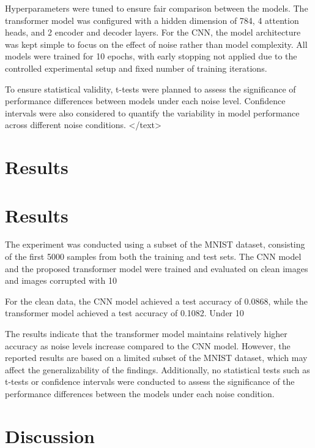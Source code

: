 \documentclass{article}
\begin{document}
Hyperparameters were tuned to ensure fair comparison between the models. The transformer model was configured with a hidden dimension of 784, 4 attention heads, and 2 encoder and decoder layers. For the CNN, the model architecture was kept simple to focus on the effect of noise rather than model complexity. All models were trained for 10 epochs, with early stopping not applied due to the controlled experimental setup and fixed number of training iterations.

To ensure statistical validity, t-tests were planned to assess the significance of performance differences between models under each noise level. Confidence intervals were also considered to quantify the variability in model performance across different noise conditions.
</text>
\section{Results}
\section{Results}

The experiment was conducted using a subset of the MNIST dataset, consisting of the first 5000 samples from both the training and test sets. The CNN model and the proposed transformer model were trained and evaluated on clean images and images corrupted with 10%

For the clean data, the CNN model achieved a test accuracy of 0.0868, while the transformer model achieved a test accuracy of 0.1082. Under 10%

The results indicate that the transformer model maintains relatively higher accuracy as noise levels increase compared to the CNN model. However, the reported results are based on a limited subset of the MNIST dataset, which may affect the generalizability of the findings. Additionally, no statistical tests such as t-tests or confidence intervals were conducted to assess the significance of the performance differences between the models under each noise condition.
\section{Discussion}
\end{document}
